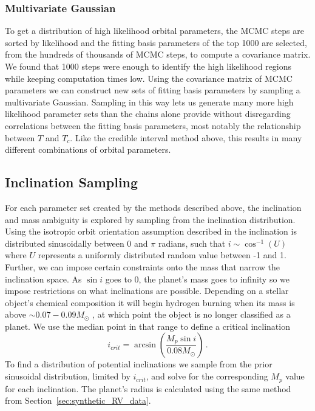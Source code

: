 \subsubsection{Multivariate Gaussian}
To get a distribution of high likelihood orbital parameters, the MCMC steps are sorted by likelihood
and the fitting basis parameters of the top 1000 are selected, from the hundreds of
thousands of MCMC steps, to compute a covariance matrix. We found that 1000 steps were enough to
identify the high likelihood regions while keeping computation times low. Using the
covariance matrix of MCMC parameters we can construct new sets of fitting basis parameters by
sampling a multivariate Gaussian. Sampling in this way lets us generate many more high
likelihood parameter sets than the chains alone provide without disregarding correlations between
the fitting basis parameters, most notably the relationship between $T$ and $T_c$. Like the credible
interval method above, this results in many different combinations of orbital parameters.

\subsection{Inclination Sampling}%
\label{subsub:inclination_sampling}
For each parameter set created by the methods described above, the inclination and mass ambiguity is
explored by sampling from the inclination distribution. Using the isotropic orbit orientation
assumption described in \citet{Savransky2011a} the inclination is distributed sinusoidally between
$0$ and $\pi$ radians, such that $i \sim \cos^{-1}\left(U\right)$ where $U$ represents a uniformly
distributed random value between -1 and 1. Further, we can impose certain constraints onto the mass
that narrow the inclination space. As $\sin{i}$ goes to 0, the planet's mass goes to infinity so we
impose restrictions on what inclinations are possible. Depending on a stellar object's chemical
composition it will begin hydrogen burning when its mass is above $\sim 0.07-0.09 M_{\odot}$
\citep{Perryman2018a}, at which point the object is no longer classified as a planet.  We use
the median point in that range to define a critical inclination
\begin{equation}
    i_{crit} = \arcsin\left(\frac{M_p \sin{i}}{0.08 M_{\odot}}\right) \,.
\end{equation}
To find a distribution of potential inclinations we sample from the prior sinusoidal distribution,
limited by $i_{crit}$, and solve for the corresponding $M_p$ value for each
inclination. The planet's radius is calculated using the same method from
Section~\ref{sec:synthetic_RV_data}.

